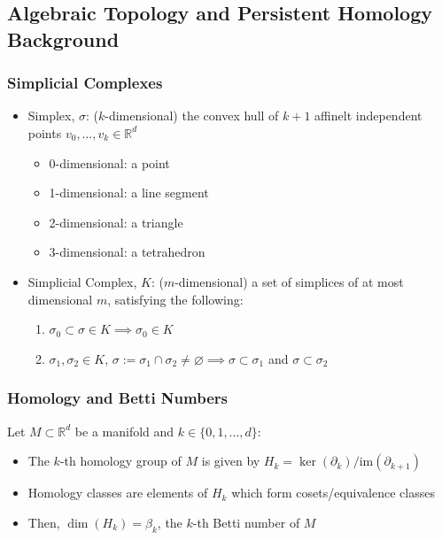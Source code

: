 \documentclass{article}
\newcommand{\R}{\mathbb{R}}
\newcommand{\im}{\text{im}}
\begin{document}
\subsection*{Algebraic Topology and Persistent Homology Background}

\subsubsection*{Simplicial Complexes}
\begin{itemize}
	\item Simplex, $\sigma$: ($k$-dimensional) the convex hull of $k+1$ affinelt independent points $v_0, \dots, v_k \in \R^d$
	\begin{itemize}
		\item 0-dimensional: a point
		\item 1-dimensional: a line segment
		\item 2-dimensional: a triangle 
		\item 3-dimensional: a tetrahedron
	\end{itemize}
	\item Simplicial Complex, $K$: ($m$-dimensional) a set of simplices of at most dimensional $m$, satisfying the following:
	\begin{enumerate}
		\item[(i)] $\sigma_0 \subset \sigma \in K \implies \sigma_0 \in K$
		\item[(ii)] $\sigma_1, \sigma_2 \in K$, $\sigma := \sigma_1 \cap \sigma_2 \neq \varnothing \implies \sigma \subset \sigma_1$ and $\sigma \subset \sigma_2$
	\end{enumerate}
\end{itemize}

\subsubsection*{Homology and Betti Numbers}
Let $M \subset \R^d$ be a manifold and $k \in \{ 0, 1, \dots, d \}$:
\begin{itemize}
	\item The $k$-th homology group of $M$ is given by $H_k = \ker(\partial_k) / \im(\partial_{k+1})$
	\item Homology classes are elements of $H_k$ which form cosets/equivalence classes
	\item Then, $\dim(H_k) = \beta_k$, the $k$-th Betti number of $M$
\end{itemize}
\end{document}
